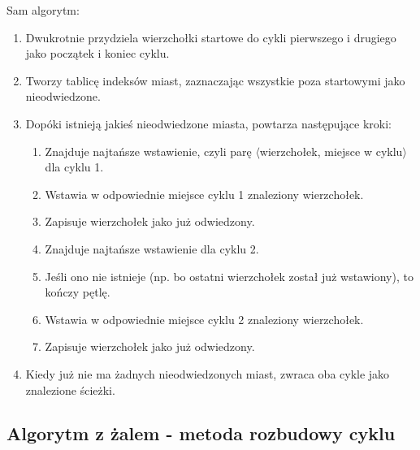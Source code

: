 \documentclass[11pt]{article}
\begin{document}
Sam algorytm:
\begin{enumerate}
    \item Dwukrotnie przydziela wierzchołki startowe do cykli pierwszego i drugiego jako początek i koniec cyklu.
    \item Tworzy tablicę indeksów miast, zaznaczając wszystkie poza startowymi jako nieodwiedzone.
    \item Dopóki istnieją jakieś nieodwiedzone miasta, powtarza następujące kroki:
    \begin{enumerate}
        \item Znajduje najtańsze wstawienie, czyli parę \(\langle\)wierzchołek, miejsce w cyklu\(\rangle\) dla cyklu 1.
        \item Wstawia w odpowiednie miejsce cyklu 1 znaleziony wierzchołek.
        \item Zapisuje wierzchołek jako już odwiedzony.
        \item Znajduje najtańsze wstawienie dla cyklu 2.
        \item Jeśli ono nie istnieje (np. bo ostatni wierzchołek został już wstawiony), to kończy pętlę.
        \item Wstawia w odpowiednie miejsce cyklu 2 znaleziony wierzchołek.
        \item Zapisuje wierzchołek jako już odwiedzony.
    \end{enumerate}
    \item Kiedy już nie ma żadnych nieodwiedzonych miast, zwraca oba cykle jako znalezione ścieżki.
\end{enumerate}


\subsection{Algorytm z żalem - metoda rozbudowy cyklu}\label{subsec:algorytm-z-zalem---metoda-rozbudowy-cyklu}
\end{document}
